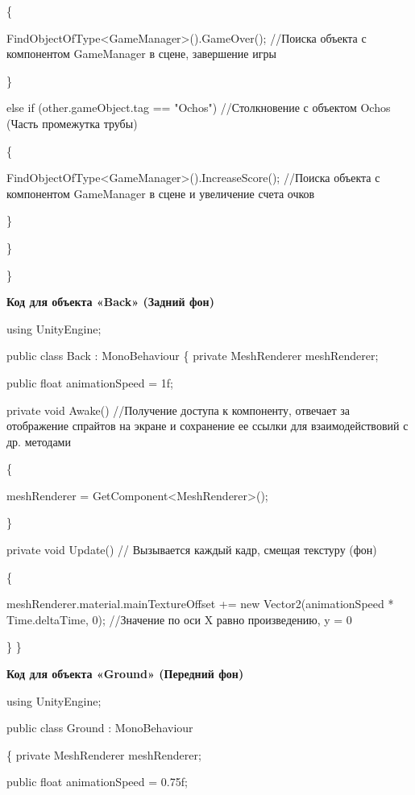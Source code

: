 \documentclass[14pt, oneside]{altsu-report}
\begin{document}
        \{

            FindObjectOfType<GameManager>().GameOver(); //Поиска объекта с компонентом GameManager в сцене, завершение игры

        \}

        else if (other.gameObject.tag == "Ochos") //Столкновение с объектом Ochos (Часть промежутка трубы)

        \{

            FindObjectOfType<GameManager>().IncreaseScore(); //Поиска объекта с компонентом GameManager в сцене и увеличение счета очков

        \}

    \}

\}


\begin{center}
\label{code:appendix}\textbf{Код для объекта «Back» (Задний фон)} 
\end{center}

using UnityEngine;

public class Back : MonoBehaviour
\{
    private MeshRenderer meshRenderer;
    
    public float animationSpeed = 1f;

    private void Awake() //Получение доступа к компоненту, отвечает за отображение спрайтов на экране и сохранение ее ссылки для взаимодействовий с др. методами

    \{
    
        meshRenderer = GetComponent<MeshRenderer>();
        
    \}

    private void Update() // Вызывается каждый кадр, смещая текстуру (фон) 

    \{
    
        meshRenderer.material.mainTextureOffset += new Vector2(animationSpeed * Time.deltaTime, 0); //Значение по оси X равно произведению, y =  0
        
    \}
\}

\begin{center}
\label{code:appendix}\textbf{Код для объекта «Ground» (Передний фон)} 
\end{center}

using UnityEngine;

public class Ground : MonoBehaviour

\{
    private MeshRenderer meshRenderer;
    
    public float animationSpeed = 0.75f;
\end{document}
